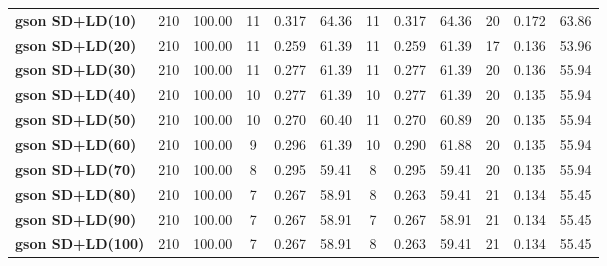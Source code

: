 \documentclass[12pt, a4paper, twoside]{report}
\begin{document}
\begin{table}[htbp]
{\begin{tabular}{|l|c|c|ccc|ccc|ccc|}
\hline
\textbf{gson SD+LD(10)} & 210 & 100.00 & 11 & \cellcolor[HTML]{fef9e4}0.317 & \cellcolor[HTML]{fef9e4}64.36 & 11 & \cellcolor[HTML]{fef9e4}0.317 & \cellcolor[HTML]{fef9e4}64.36 & 20 & \cellcolor[HTML]{fef9e4}0.172 & \cellcolor[HTML]{fef9e4}63.86 \\
\textbf{gson SD+LD(20)} & 210 & 100.00 & 11 & 0.259 & 61.39 & 11 & 0.259 & 61.39 & 17 & 0.136 & 53.96 \\
\textbf{gson SD+LD(30)} & 210 & 100.00 & 11 & 0.277 & 61.39 & 11 & 0.277 & 61.39 & 20 & 0.136 & 55.94 \\
\textbf{gson SD+LD(40)} & 210 & 100.00 & 10 & 0.277 & 61.39 & 10 & 0.277 & 61.39 & 20 & 0.135 & 55.94 \\
\textbf{gson SD+LD(50)} & 210 & 100.00 & 10 & 0.270 & 60.40 & 11 & 0.270 & 60.89 & 20 & 0.135 & 55.94 \\
\textbf{gson SD+LD(60)} & 210 & 100.00 & 9 & 0.296 & 61.39 & 10 & 0.290 & 61.88 & 20 & 0.135 & 55.94 \\
\textbf{gson SD+LD(70)} & 210 & 100.00 & 8 & 0.295 & 59.41 & 8 & 0.295 & 59.41 & 20 & 0.135 & 55.94 \\
\textbf{gson SD+LD(80)} & 210 & 100.00 & 7 & 0.267 & 58.91 & 8 & 0.263 & 59.41 & 21 & 0.134 & 55.45 \\
\textbf{gson SD+LD(90)} & 210 & 100.00 & 7 & 0.267 & 58.91 & 7 & 0.267 & 58.91 & 21 & 0.134 & 55.45 \\
\textbf{gson SD+LD(100)} & 210 & 100.00 & 7 & 0.267 & 58.91 & 8 & 0.263 & 59.41 & 21 & 0.134 & 55.45 \\
\hline
\end{tabular}
}
\end{table}
\end{document}
